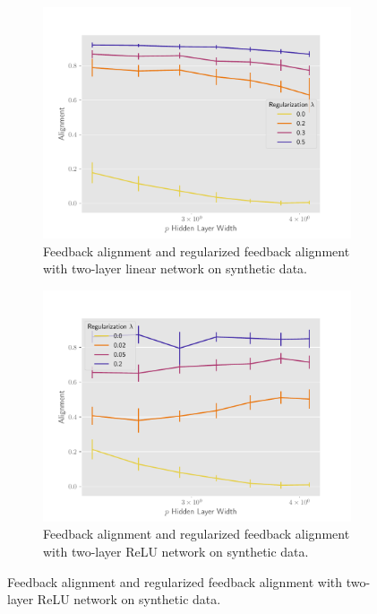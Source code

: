 \begin{figure}[h]
\centering
\begin{subfigure}[b]{.49\textwidth}
  \centering
  \includegraphics[width=\linewidth]{figures/align_lr_non_autograd_l2_v4.pdf}
  \caption{Feedback alignment and regularized feedback alignment with two-layer linear network on synthetic data.}
  \label{fig:align_lr_non_autograd_l2}
\end{subfigure}\hfill
\begin{subfigure}[b]{.49\textwidth}
  \centering
  \includegraphics[width=\linewidth]{figures/align_nn_relu_autograd_l2_v4.pdf}
  \caption{Feedback alignment and regularized feedback alignment with two-layer ReLU network on synthetic data.}
  \label{fig:align_nn_relu_autograd_l2}

\end{subfigure}
\end{figure}
